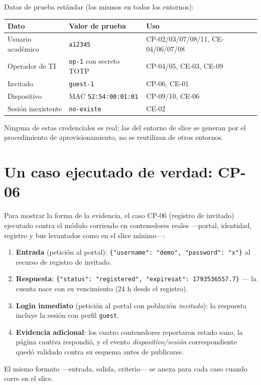 \documentclass[11pt,a4paper]{article}
\begin{document}
Datos de prueba estándar (los mismos en todos los entornos):

\begin{longtable}{p{3.6cm}p{4.4cm}p{6.0cm}}
\toprule
\textbf{Dato} & \textbf{Valor de prueba} & \textbf{Uso}\\
\midrule
Usuario académico & \texttt{a12345} & CP-02/03/07/08/11, CE-04/06/07/08\\
Operador de TI & \texttt{op-1} con secreto TOTP & CP-04/05, CE-03, CE-09\\
Invitado & \texttt{guest-1} & CP-06, CE-01\\
Dispositivo & MAC \texttt{52:54:00:01:01} & CP-09/10, CE-06\\
Sesión inexistente & \texttt{no-existe} & CE-02\\
\bottomrule
\end{longtable}

Ninguna de estas credenciales es real; las del entorno de slice se generan por el procedimiento de aprovisionamiento, no se reutilizan de otros entornos.

\section{Un caso ejecutado de verdad: CP-06}

Para mostrar la forma de la evidencia, el caso CP-06 (registro de invitado) ejecutado contra el módulo corriendo en contenedores reales ---portal, identidad, registro y bus levantados como en el slice mínimo---:

\begin{enumerate}
\item \textbf{Entrada} (petición al portal): \texttt{\{"username": "demo", "password": "x"\}} al recurso de registro de invitado.
\item \textbf{Respuesta}: \texttt{\{"status": "registered", "expires\textunderscore at": 1793536557.7\}} --- la cuenta nace con su vencimiento (24 h desde el registro).
\item \textbf{Login inmediato} (petición al portal con población \emph{invitado}): la respuesta incluye la sesión con perfil \texttt{guest}.
\item \textbf{Evidencia adicional}: los cuatro contenedores reportaron estado sano, la página cautiva respondió, y el evento \emph{dispositivo/sesión} correspondiente quedó validado contra su esquema antes de publicarse.
\end{enumerate}

El mismo formato ---entrada, salida, criterio--- se anexa para cada caso cuando corre en el slice.
\end{document}
